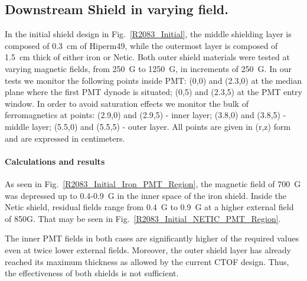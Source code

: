 \documentclass[12pt]{article}
\begin{document}


\subsection{Downstream Shield  in varying field.} 
\label{R2083_Triple_No_Coil}
In the initial shield design in Fig.~\ref{R2083_Initial}, the middle shielding 
layer is composed of 0.3~cm of Hiperm49, while the outermost layer is composed
of 1.5~cm thick of either iron or Netic. Both outer shield materials were
tested at varying magnetic fields, from 250~G to 1250~G, in increments of 250~G.
In our tests we  monitor the following  points inside PMT:
 (0,0) and (2.3,0) at  the median plane where the  first PMT dynode is situated;
 (0,5) and (2.3,5) at  the PMT entry window.
In order to avoid  saturation effects we monitor the bulk of ferromagnetics at points:
 (2.9,0) and (2.9,5) - inner layer; 
 (3.8,0) and (3.8,5) - middle layer; 
(5.5,0) and (5.5,5)  - outer layer.
All points are given in (r,z) form and are expressed in centimeters.
\paragraph{Calculations and results}
 As seen in Fig.~\ref{R2083_Initial_Iron_PMT_Region},
the  magnetic field of 700~G  was depressed up to 0.4-0.9~G in the inner space  of  the
iron shield.
 Inside the Netic shield, residual fields range from 0.4~G to 0.9~G at a higher external field of
850G. That  may be  seen  in Fig.~\ref{R2083_Initial_NETIC_PMT_Region}.

The inner PMT fields in both cases are significantly higher of the required values even 
at twice lower external fields. Moreover, the outer shield layer has already  reached  its maximum 
thickness as allowed by the current CTOF design.  Thus, the effectiveness  of both shields is not sufficient. 
\end{document}
